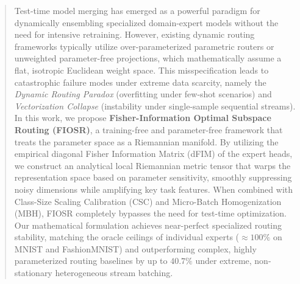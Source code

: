 \begin{abstract}
Test-time model merging has emerged as a powerful paradigm for dynamically ensembling specialized domain-expert models without the need for intensive retraining. However, existing dynamic routing frameworks typically utilize over-parameterized parametric routers or unweighted parameter-free projections, which mathematically assume a flat, isotropic Euclidean weight space. This misspecification leads to catastrophic failure modes under extreme data scarcity, namely the \emph{Dynamic Routing Paradox} (overfitting under few-shot scenarios) and \emph{Vectorization Collapse} (instability under single-sample sequential streams). In this work, we propose \textbf{Fisher-Information Optimal Subspace Routing (FIOSR)}, a training-free and parameter-free framework that treats the parameter space as a Riemannian manifold. By utilizing the empirical diagonal Fisher Information Matrix (dFIM) of the expert heads, we construct an analytical local Riemannian metric tensor that warps the representation space based on parameter sensitivity, smoothly suppressing noisy dimensions while amplifying key task features. When combined with Class-Size Scaling Calibration (CSC) and Micro-Batch Homogenization (MBH), FIOSR completely bypasses the need for test-time optimization. Our mathematical formulation achieves near-perfect specialized routing stability, matching the oracle ceilings of individual experts ($\approx 100\%$ on MNIST and FashionMNIST) and outperforming complex, highly parameterized routing baselines by up to $40.7\%$ under extreme, non-stationary heterogeneous stream batching.
\end{abstract}
